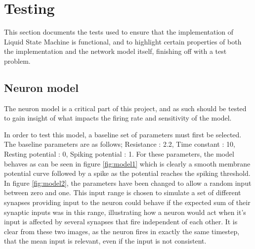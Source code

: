 \chapter{Testing}

This section documents the tests used to ensure that the implementation of Liquid State Machine is functional, and to highlight certain properties of both the implementation and the network model itself, finishing off with a test problem.

\section{Neuron model}

The neuron model is a critical part of this project, and as such should be tested to gain insight of what impacts the firing rate and sensitivity of the model.

In order to test this model, a baseline set of parameters must first be selected. The baseline parameters are as follows; Resistance : 2.2, Time constant : 10, Resting potential : 0, Spiking potential : 1. For these parameters, the model behaves as can be seen in figure \ref{fig:model1} which is clearly a smooth membrane potential curve followed by a spike as the potential reaches the spiking threshold. In figure \ref{fig:model2}, the parameters have been changed to allow a random input between zero and one. This input range is chosen to simulate a set of different synapses providing input to the neuron could behave if the expected sum of their synaptic inputs was in this range, illustrating how a neuron would act when it's input is affected by several synapses that fire independent of each other. It is clear from these two images, as the neuron fires in exactly the same timestep, that the mean input is relevant, even if the input is not consistent.

